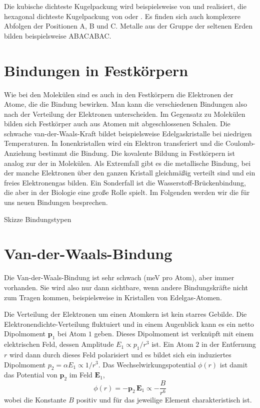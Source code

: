Die kubische dichteste Kugelpackung wird beispielsweise von  und  realisiert, die hexagonal dichteste Kugelpackung von  oder . Es finden sich auch komplexere Abfolgen der Positionen A, B und C. Metalle aus der Gruppe der seltenen Erden bilden beispielsweise ABACABAC.






\section{Bindungen in Festkörpern}



Wie bei den Molekülen  sind es auch in den Festkörpern die Elektronen der Atome, die die Bindung bewirken. Man kann die verschiedenen Bindungen also nach der Verteilung der Elektronen unterscheiden. Im Gegensatz zu Molekülen bilden sich Festkörper auch aus Atomen mit abgeschlossenen Schalen. Die schwache van-der-Waals-Kraft bildet beispielsweise Edelgaskristalle bei niedrigen Temperaturen. In Ionenkristallen wird ein Elektron transferiert und die Coulomb-Anziehung  bestimmt die Bindung. Die kovalente Bildung in Festkörpern ist analog zur der in Molekülen. Als Extremfall gibt es die metallische Bindung, bei der manche Elektronen über den ganzen Kristall gleichmäßig verteilt sind und  ein freies Elektronengas bilden. Ein Sonderfall ist die Wasserstoff-Brückenbindung, die aber in der Biologie eine große Rolle spielt. Im Folgenden werden wir die für uns neuen  Bindungen besprechen.

\begin{marginfigure}

\caption{Skizze Bindungstypen}
\end{marginfigure}



\section{Van-der-Waals-Bindung}

Die Van-der-Waals-Bindung ist sehr schwach (meV pro Atom), aber immer vorhanden. Sie wird also nur dann sichtbare, wenn andere Bindungskräfte nicht zum Tragen kommen, beispielsweise in Kristallen von Edelgas-Atomen.

Die Verteilung der Elektronen um einen Atomkern ist kein starres Gebilde. Die Elektronendichte-Verteilung fluktuiert und in einem Augenblick kann es ein netto Dipolmoment $\mathbf{p}_1$ bei Atom $1$ geben. Dieses Dipolmoment ist verknüpft mit einem elektrischen Feld, dessen Amplitude $E_1 \propto p_1 / r^3$ ist. Ein Atom $2$ in der Entfernung $r$ wird dann durch dieses Feld polarisiert und es bildet sich ein induziertes Dipolmoment $p_2 = \alpha E_1 \propto 1/r^3$. Das Wechselwirkungspotential $\phi(r)$ ist damit das Potential von $\mathbf{p}_2$ im Feld $\mathbf{E}_1$, 
\begin{equation}
 \phi(r) = - \mathbf{p}_2 \, \mathbf{E}_1 \propto - \frac{B}{r^6}
\end{equation}
wobei die Konstante $B$ positiv und für das jeweilige Element charakteristisch ist.

